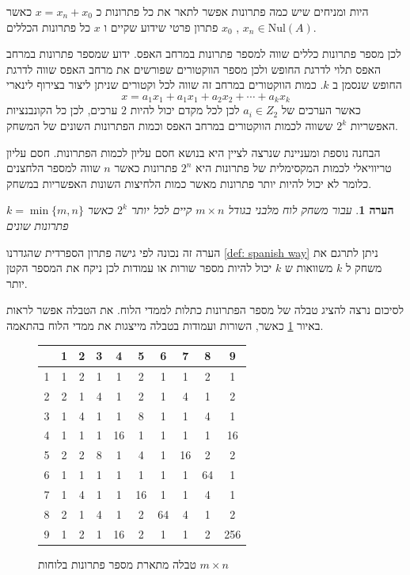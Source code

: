 \documentclass[12pt,leqno]{article}
\theoremstyle{theoremdd}
\newtheorem{comm}{הערה}
\newcommand{\Nul}{\mathrm{Nul}}
\begin{document}
היות ומניחים שיש כמה פתרונות אפשר לתאר את כל פתרונות כ
$x = x_n + x_0$
כאשר 
$x_n \in \Nul(A)$ ,
$x_0$ 
פתרון פרטי שידוע שקיים 
ו
$x$
כל פתרונות הכללים.

לכן מספר פתרונות כללים שווה למספר פתרונות במרחב האפס.
ידוע שמספר פתרונות במרחב האפס תלוי לדרגת החופש ולכן מספר הווקטורים שפורשים
את מרחב האפס שווה לדרגת החופש שנסמן ב
$k$.
כמות הווקטורים במרחב זה שווה לכל וקטורים שניתן ליצור בצירוף לינארי 
\[x = a_1 x_1 + a_1 x_1 + a_2 x_2 + \cdots + a_k x_k\]
כאשר הערכים של
$a_i \in Z_2$
לכן 
לכל מקדם יכול להיות
$2$
ערכים,
לכן כל הקונבנציות האפשריות 
$2^k$
ששווה
לכמות הווקטורים 
במרחב האפס וכמות הפתרונות השונים של המשחק.

הבחנה נוספת ומעניינת שנרצה לציין היא בנושא חסם עליון לכמות הפתרונות.
חסם עליון טריוויאלי לכמות המקסימלית של פתרונות היא 
$2^n$
פתרונות כאשר
$n$
שווה למספר הלחצנים כלומר לא יכול להיות יותר פתרונות מאשר כמות הלחיצות השונות האפשריות במשחק.
\begin{comm}
    עבור משחק לוח מלבני
    בגודל 
    $m \times n$
    קיים לכל יותר 
    $2^k$
    כאשר 
    $k = \min\{m,n\}$
    פתרונות שונים
\end{comm}
הערה זה נכונה לפי גישה פתרון הספרדית
שהגדרנו
\ref{def: spanish way}
ניתן לתרגם את משחק ל
$k$
משוואות 
ש
$k$
יכול להיות מספר שורות או עמודות 
לכן ניקח את המספר הקטן יותר.

לסיכום נרצה להציג טבלה של מספר הפתרונות כתלות לממדי הלוח.
את הטבלה אפשר לראות באיור 
\ref{fig:num-sol-in-table}
כאשר, השורות ועמודות בטבלה מייצגות 
את ממדי הלוח בהתאמה.

\begin{figure}
    \caption{טבלה מתארת מספר פתרונות בלוחות 
    $m \times n$
    }
    \centering
    \label{fig:num-sol-in-table}
    \begin{english}
        \begin{tabular}{ |c||c|c|c|c|c|c|c|c|c| }
            \hline
            \ & 1 & 2 & 3 & 4 & 5 & 6 & 7 & 8 & 9 \\
            \hline
            \hline
            1 & 1 & 2 & 1 & 1 & 2 & 1 & 1 & 2 & 1 \\
            \hline
            2 & 2 & 1 & 4 & 1 & 2 & 1 & 4 & 1 & 2 \\
            \hline
            3 & 1 & 4 & 1 & 1 & 8 & 1 & 1 & 4 & 1 \\
            \hline
            4 & 1 & 1 & 1 & 16 & 1 & 1 & 1 & 1 & 16 \\
            \hline
            5 & 2 & 2 & 8 & 1 & 4 & 1 & 16 & 2 & 2 \\
            \hline
            6 & 1 & 1 & 1 & 1 & 1 & 1 & 1 & 64 & 1 \\
            \hline
            7 & 1 & 4 & 1 & 1 & 16 & 1 & 1 & 4 & 1 \\
            \hline
            8 & 2 & 1 & 4 & 1 & 2 & 64 & 4 & 1 & 2 \\
            \hline
            9 & 1 & 2 & 1 & 16 & 2 & 1 & 1 & 2 & 256 \\
            \hline
        \end{tabular}
    \end{english}
\end{figure}
\end{document}
